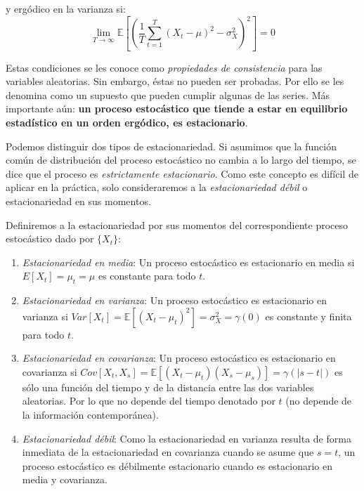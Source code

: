 \documentclass[
]{book}
\begin{document}
y ergódico en la varianza si:
\begin{equation}
    \displaystyle\lim_{T \to \infty}{\mathbb{E} \left[ \left( \frac{1}{T} \sum^{T}_{t = 1} (X_t - \mu) ^2 - \sigma^2_X \right) ^2 \right]} = 0
    \label{eq:LIM2}
\end{equation}

Estas condiciones se les conoce como \emph{propiedades de consistencia} para las variables aleatorias. Sin embargo, éstas no pueden ser probadas. Por ello se les denomina como un supuesto que pueden cumplir algunas de las series. Más importante aún: \textbf{un proceso estocástico que tiende a estar en equilibrio estadístico en un orden ergódico, es estacionario}.

Podemos distinguir dos tipos de estacionariedad. Si asumimos que la función común de distribución del proceso estocástico no cambia a lo largo del tiempo, se dice que el proceso es \emph{estrictamente estacionario}. Como este concepto es difícil de aplicar en la práctica, solo consideraremos a la \emph{estacionariedad débil} o estacionariedad en sus momentos.

Definiremos a la estacionariedad por sus momentos del correspondiente proceso estocástico dado por \(\{X_t\}\):

\begin{enumerate}
\def\labelenumi{\arabic{enumi}.}
\item
  \emph{Estacionariedad en media}: Un proceso estocástico es estacionario en media si \(E[X_t] = \mu_t = \mu\) es constante para todo \(t\).
\item
  \emph{Estacionariedad en varianza}: Un proceso estocástico es estacionario en varianza si \(Var[X_t] = \mathbb{E}[(X_t - \mu_t)^2] = \sigma^2_X = \gamma(0)\) es constante y finita para todo \(t\).
\item
  \emph{Estacionariedad en covarianza}: Un proceso estocástico es estacionario en covarianza si \(Cov[X_t,X_s] = \mathbb{E}[(X_t - \mu_t)(X_s - \mu_s)] = \gamma(|s-t|)\) es sólo una función del tiempo y de la distancia entre las dos variables aleatorias. Por lo que no depende del tiempo denotado por \(t\) (no depende de la información contemporánea).
\item
  \emph{Estacionariedad débil}: Como la estacionariedad en varianza resulta de forma inmediata de la estacionariedad en covarianza cuando se asume que \(s = t\), un proceso estocástico es débilmente estacionario cuando es estacionario en media y covarianza.
\end{enumerate}
\end{document}
